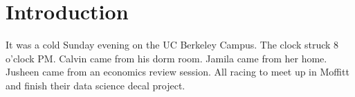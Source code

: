 \documentclass{article}
\begin{document}
\section{Introduction}
It was a cold Sunday evening on the UC Berkeley Campus. The clock struck 8 o'clock PM. Calvin came from his dorm room. Jamila came from her home. Jusheen came from an economics review session. All racing to meet up in Moffitt and finish their data science decal project.
\end{document}
